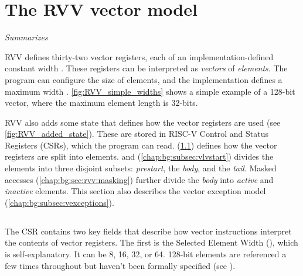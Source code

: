 \section{The RVV vector model}\label{chap:bg:sec:rvv:vector_model}
\emph{Summarizes \cite[Sections 1-6, 17]{RISCVVectorExtension2021}}


RVV defines thirty-two vector registers, each of an implementation-defined constant width .
These registers can be interpreted as \emph{vectors} of \emph{elements}.
The program can configure the size of elements, and the implementation defines a maximum width .
\cref{fig:RVV_simple_widths} shows a simple example of a 128-bit vector, where the maximum element length is 32-bits.

RVV also adds some state that defines how the vector registers are used (see \cref{fig:RVV_added_state}).
These are stored in RISC-V Control and Status Registers (CSRs), which the program can read.
 (\cref{chap:bg:subsec:vtype}) defines how the vector registers are split into elements.
 and  (\cref{chap:bg:subsec:vlvstart}) divides the elements into three disjoint subsets: \emph{prestart}, the \emph{body}, and the \emph{tail}.
Masked accesses (\cref{chap:bg:sec:rvv:masking}) further divide the \emph{body} into \emph{active} and \emph{inactive} elements.
This section also describes the vector exception model (\cref{chap:bg:subsec:vexceptions}).

\subsection{}\label{chap:bg:subsec:vtype}
The  CSR contains two key fields that describe how vector instructions interpret the contents of vector registers.
The first is the Selected Element Width (), which is self-explanatory.
It can be 8, 16, 32, or 64.
128-bit elements are referenced a few times throughout but haven't been formally specified (see \cite[p32]{RISCVVectorExtension2021}).

